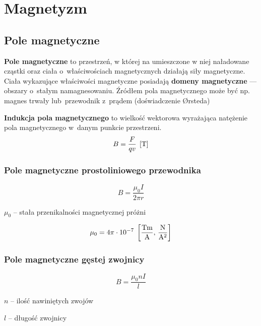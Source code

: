 \chapter{Magnetyzm}
  \section{Pole magnetyczne}
    \begin{definition}
      \textbf{Pole magnetyczne} to przestrzeń, w której na umieszczone w niej naładowane cząstki oraz ciała o~właściwościach magnetycznych działają siły magnetyczne. Ciała wykazujące właściwości magnetyczne posiadają \textbf{domeny magnetyczne} --- obszary o~stałym namagnesowaniu. Źródłem pola magnetycznego może być np. magnes trwały lub~przewodnik z~prądem (doświadczenie Ørsteda)
      \begin{center}
        \begin{tikzpicture}
        \end{tikzpicture}
      \end{center}
    \end{definition}

    \begin{definition}
      \textbf{Indukcja pola magnetycznego} to wielkość wektorowa wyrażająca natężenie pola magnetycznego w~danym punkcie przestrzeni.
      \begin{equation}
        B = \frac{F}{qv} \unit T
      \end{equation}
    \end{definition}

    \subsection{Pole magnetyczne prostoliniowego przewodnika}
      \begin{equation*}
        B = \frac{\mu_0 I}{2\pi r}
      \end{equation*}
      \begin{symbols}
        \item $\mu_0$ -- stała przenikalności magnetycznej próżni
      \end{symbols}
      \begin{equation*}
        \mu_0 = 4\pi\cdot 10^{-7} \units{\frac{Tm}{A}}{\frac{N}{A^2}}
      \end{equation*}

    \subsection{Pole magnetyczne gęstej zwojnicy}
      \begin{equation*}
        B = \frac{\mu_0 nI}{l}
      \end{equation*}
      \begin{symbols}
        \item $n$ -- ilość nawiniętych zwojów
        \item $l$ -- długość zwojnicy
      \end{symbols}


